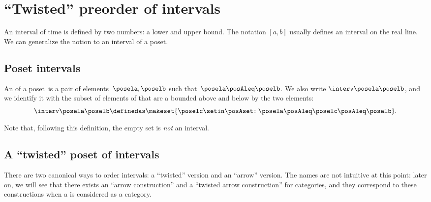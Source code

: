 
\section{``Twisted'' preorder of intervals}


An interval of time is defined by two numbers: a lower and upper bound.
The notation $[a,b]$ usually defines an interval on the real line.
We can generalize the notion to an interval of a poset.

\subsection{Poset intervals}
\begin{marginfigure}
    \centering
    \caption{Poset interval on $\reals^2$.}
    \label{fig:int_posets}
\end{marginfigure}

\begin{definition}[Interval]
    \label{def:interval}
    An  of a poset~\posA is a pair of elements~$\posela, \poselb$ such that~$\posela \posAleq \poselb$.
    We also write $\interv \posela \poselb$, and we identify it with the subset of elements of \posA that are a bounded above and below by the two elements:
    \begin{equation}\label{eq:interval}
        \interv \posela \poselb
        \definedas
        \makeset{
            \poselc \setin \posAset \colon
            \posela \posAleq \poselc \posAleq \poselb
        }.
    \end{equation}
\end{definition}

Note that, following this definition, the empty set is \emph{not} an interval.

\subsection{A ``twisted''  poset of  intervals}

There are two canonical ways to order  intervals: a ``twisted'' version and an ``arrow'' version.
The names are not intuitive at this point: later on, we will see that there exists an ``arrow construction'' and a ``twisted arrow construction'' for categories, and they correspond to these constructions when a  is considered as a category.

